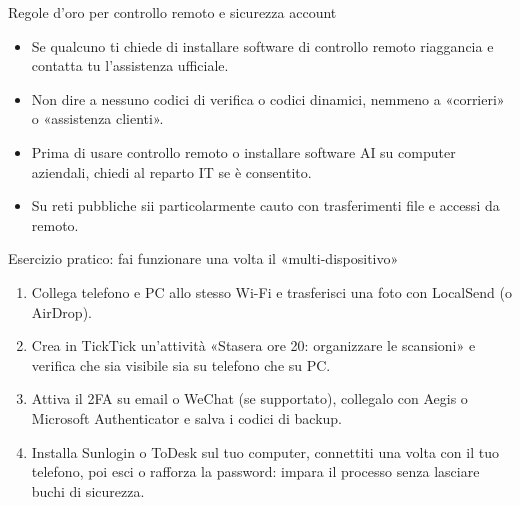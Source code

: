 \begin{tcbwarn}{Regole d'oro per controllo remoto e sicurezza account}
\begin{itemize}
  \item Se qualcuno ti chiede di installare software di controllo remoto riaggancia e contatta tu l'assistenza ufficiale.
  \item Non dire a nessuno codici di verifica o codici dinamici, nemmeno a «corrieri» o «assistenza clienti».
  \item Prima di usare controllo remoto o installare software AI su computer aziendali, chiedi al reparto IT se è consentito.
  \item Su reti pubbliche sii particolarmente cauto con trasferimenti file e accessi da remoto.
\end{itemize}

\end{tcbwarn}

\begin{tcbpractice}{Esercizio pratico: fai funzionare una volta il «multi-dispositivo»}
\begin{enumerate}
  \item Collega telefono e PC allo stesso Wi-Fi e trasferisci una foto con LocalSend (o AirDrop).
  \item Crea in TickTick un'attività «Stasera ore 20: organizzare le scansioni» e verifica che sia visibile sia su telefono che su PC.
  \item Attiva il 2FA su email o WeChat (se supportato), collegalo con Aegis o Microsoft Authenticator e salva i codici di backup.
  \item Installa Sunlogin o ToDesk sul tuo computer, connettiti una volta con il tuo telefono, poi esci o rafforza la password: impara il processo senza lasciare buchi di sicurezza.
\end{enumerate}

\end{tcbpractice}
